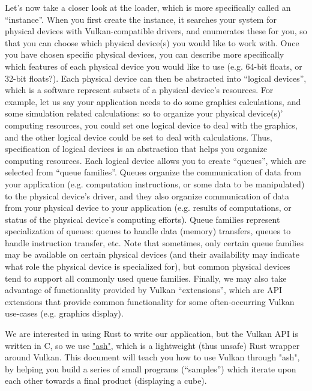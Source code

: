 \documentclass[12pt,letterpaper]{article}
\newcommand{\inquotes}[1]{``#1''}	%
\begin{document}
Let's now take a closer look at the loader, which is more specifically called an \inquotes{instance}. When you first create the instance, it searches your system for physical devices with Vulkan-compatible drivers, and enumerates these for you, so that you can choose which physical device(s) you would like to work with. Once you have chosen specific physical devices, you can describe more specifically which features of each physical device you would like to use (e.g. 64-bit floats, or 32-bit floats?). Each physical device can then be abstracted into \inquotes{logical devices}, which is a software represent subsets of a physical device's resources. For example, let us say your application needs to do some graphics calculations, and some simulation related calculations: so to organize your physical device(s)' computing resources, you could set one logical device to deal with the graphics, and the other logical device could be set to deal with calculations. Thus, specification of logical devices is an abstraction that helps you organize computing resources. Each logical device allows you to create \inquotes{queues}, which are selected from \inquotes{queue families}. Queues organize the communication of data from your application (e.g. computation instructions, or some data to be manipulated) to the physical device's driver, and they also organize communication of data from your physical device to your application (e.g. results of computations, or status of the physical device's computing efforts). Queue families represent specialization of queues: queues to handle data (memory) transfers, queues to handle instruction transfer, etc. Note that sometimes, only certain queue families may be available on certain physical devices (and their availability may indicate what role the physical device is specialized for), but common physical devices tend to support all commonly used queue families. Finally, we may also take advantage of functionality provided by Vulkan \inquotes{extensions}, which are API extensions that provide common functionality for some often-occurring Vulkan use-cases (e.g. graphics display).

We are interested in using Rust to write our application, but the Vulkan API is written in C, so we use \href{https://github.com/MaikKlein/"ash"}{"ash"}, which is a lightweight (thus unsafe) Rust wrapper around Vulkan. This document will teach you how to use Vulkan through "ash", by helping you build a series of small programs (\inquotes{samples}) which iterate upon each other towards a final product (displaying a cube). 
\end{document}
